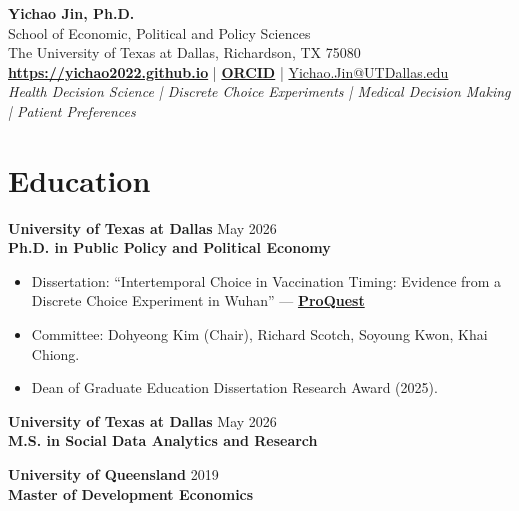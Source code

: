 \documentclass[11pt, letterpaper]{article}
\begin{document}
\thispagestyle{empty}
\pagestyle{empty}

\begin{center}
    {\huge \textbf{Yichao Jin, Ph.D.}} \\
    \vspace{0.5em}
    School of Economic, Political and Policy Sciences \\
    The University of Texas at Dallas, Richardson, TX 75080 \\
    \vspace{0.5em}
    \href{https://yichao2022.github.io}{\textbf{https://yichao2022.github.io}} \quad | \quad \href{https://orcid.org/0009-0003-7667-5143}{\textbf{ORCID}} \quad | \quad \href{mailto:Yichao.Jin@UTDallas.edu}{Yichao.Jin@UTDallas.edu} \\
    \vspace{0.5em}
    \textit{Health Decision Science \;|\; Discrete Choice Experiments \;|\; Medical Decision Making \;|\; Patient Preferences}
\end{center}

\vspace{0.5em}
\noindent\hrulefill

\section*{Education}
\textbf{University of Texas at Dallas} \hfill May 2026 \\
\textbf{Ph.D. in Public Policy and Political Economy}
\begin{itemize}[noitemsep, topsep=0pt, label={-}]
    \item Dissertation: ``Intertemporal Choice in Vaccination Timing: Evidence from a Discrete Choice Experiment in Wuhan'' --- \href{https://www.proquest.com/docview/3354986484}{\textbf{ProQuest}}
    \item Committee: Dohyeong Kim (Chair), Richard Scotch, Soyoung Kwon, Khai Chiong.
    \item Dean of Graduate Education Dissertation Research Award (2025).
\end{itemize}

\vspace{0.5em}
\noindent \textbf{University of Texas at Dallas} \hfill May 2026 \\
\textbf{M.S. in Social Data Analytics and Research}

\vspace{0.5em}
\noindent \textbf{University of Queensland} \hfill 2019 \\
\textbf{Master of Development Economics}
\end{document}
